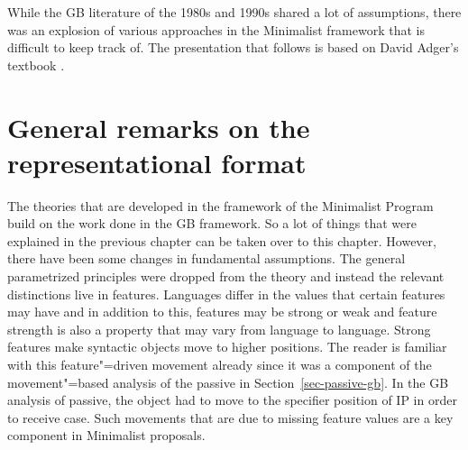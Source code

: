 
While the GB literature of the 1980s and 1990s shared a lot of assumptions, there was an explosion of various
approaches in the Minimalist framework that is difficult to keep track of. The presentation that
follows is based on David Adger's textbook \citep{Adger2003a}.


\section{General remarks on the representational format}

The theories that are developed in the framework of the Minimalist Program build on the work done in
the GB framework. So a lot of things that were explained in the previous chapter can be taken over
to this chapter. However, there have been some changes in fundamental assumptions. The general
parametrized principles were dropped from the theory and instead the relevant distinctions live in
features. Languages differ in the values that certain features may have and in addition to this,
features may be strong or weak and feature strength is also a property that may vary from language
to language. Strong features make syntactic objects move to higher positions. The
reader is familiar with this feature"=driven movement already since it was a component of the movement"=based
analysis of the passive in Section~\ref{sec-passive-gb}. In the GB analysis of passive, the object
had to move to the specifier position of IP in order to receive case. Such movements that are due to
missing feature values are a key component in Minimalist proposals.


